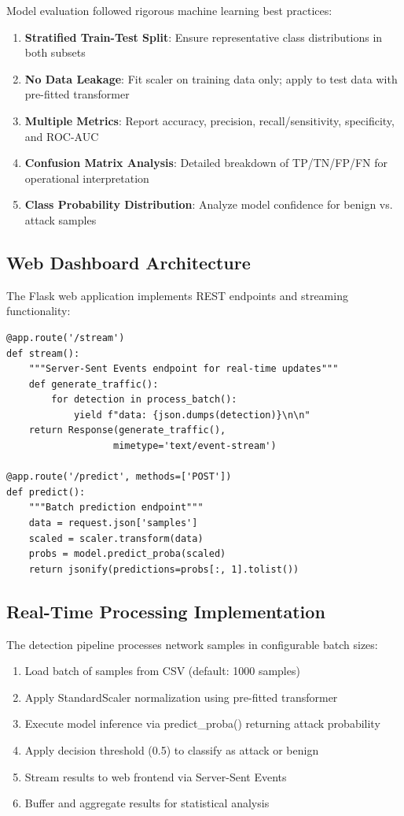 \documentclass[conference]{IEEEtran}
\begin{document}
Model evaluation followed rigorous machine learning best practices:

\begin{enumerate}
    \item \textbf{Stratified Train-Test Split}: Ensure representative class distributions in both subsets
    \item \textbf{No Data Leakage}: Fit scaler on training data only; apply to test data with pre-fitted transformer
    \item \textbf{Multiple Metrics}: Report accuracy, precision, recall/sensitivity, specificity, and ROC-AUC
    \item \textbf{Confusion Matrix Analysis}: Detailed breakdown of TP/TN/FP/FN for operational interpretation
    \item \textbf{Class Probability Distribution}: Analyze model confidence for benign vs. attack samples
\end{enumerate}

\subsection{Web Dashboard Architecture}

The Flask web application implements REST endpoints and streaming functionality:

\begin{lstlisting}
@app.route('/stream')
def stream():
    """Server-Sent Events endpoint for real-time updates"""
    def generate_traffic():
        for detection in process_batch():
            yield f"data: {json.dumps(detection)}\n\n"
    return Response(generate_traffic(), 
                   mimetype='text/event-stream')

@app.route('/predict', methods=['POST'])
def predict():
    """Batch prediction endpoint"""
    data = request.json['samples']
    scaled = scaler.transform(data)
    probs = model.predict_proba(scaled)
    return jsonify(predictions=probs[:, 1].tolist())
\end{lstlisting}

\subsection{Real-Time Processing Implementation}

The detection pipeline processes network samples in configurable batch sizes:

\begin{enumerate}
    \item Load batch of samples from CSV (default: 1000 samples)
    \item Apply StandardScaler normalization using pre-fitted transformer
    \item Execute model inference via predict\_proba() returning attack probability
    \item Apply decision threshold (0.5) to classify as attack or benign
    \item Stream results to web frontend via Server-Sent Events
    \item Buffer and aggregate results for statistical analysis
\end{enumerate}
\end{document}
